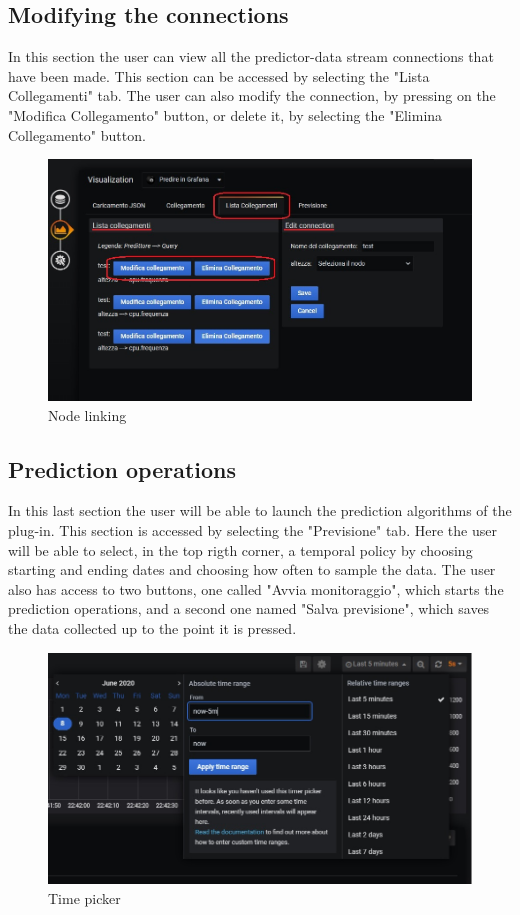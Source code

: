 \subsection{Modifying the connections}
In this section the user can view all the predictor-data stream connections that have been made. This section can be accessed by selecting the "Lista Collegamenti" tab.
The user can also modify the connection, by pressing on the "Modifica Collegamento" button, or delete it, by selecting the "Elimina Collegamento" button.

\begin{figure}[H]
\centering
\includegraphics[scale=0.75]{img/plug-in/collegamento_node.jpg}
\caption{Node linking}
\end{figure}


\subsection{Prediction operations}
In this last section the user will be able to launch the prediction algorithms of the plug-in. This section is accessed by selecting the "Previsione" tab. Here the user will be able to select, in the top rigth corner, a temporal policy by choosing starting and ending dates and choosing how often to sample the data. The user  also has access to two buttons, one called "Avvia monitoraggio", which starts the prediction operations, and a second one named "Salva previsione", which saves the data collected up to the point it is pressed.\\

\begin{figure}[H]
\centering
\includegraphics[scale=0.95]{img/plug-in/time_selector.jpg}
\caption{Time picker}
\end{figure}

